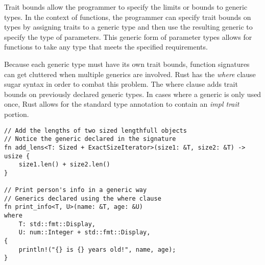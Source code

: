 \documentclass[12pt]{article}
\begin{document}
\begin{flushleft}
Trait bounds allow the programmer to specify the limits or bounds to generic
types. In the context of functions, the programmer can specify trait bounds on
types by assigning traits to a generic type and then use the resulting generic
to specify the type of parameters. This generic form of parameter types allows
for functions to take any type that meets the specified requirements.

Because each generic type must have its own trait bounds, function signatures
can get cluttered when multiple generics are involved. Rust has the
\textit{where} clause sugar syntax in order to combat this problem. The where
clause adds trait bounds on previously declared generic types. In cases where a
generic is only used once, Rust allows for the standard type annotation to
contain an \textit{impl trait} portion.

\singlespacing{}
\begin{verbatim}
// Add the lengths of two sized lengthfull objects
// Notice the generic declared in the signature
fn add_lens<T: Sized + ExactSizeIterator>(size1: &T, size2: &T) -> usize {
    size1.len() + size2.len()
}

// Print person's info in a generic way
// Generics declared using the where clause
fn print_info<T, U>(name: &T, age: &U)
where
    T: std::fmt::Display,
    U: num::Integer + std::fmt::Display,
{
    println!("{} is {} years old!", name, age);
}
\end{verbatim}
\doublespacing{}

\cite{rustforrustaceans} \\
\cite{rust-lang.org} \\
\cite{rust-by-example} \\
\cite{the-c-programming-language} \\
\cite{noboilerplate}


 

\end{flushleft}
\end{document}
